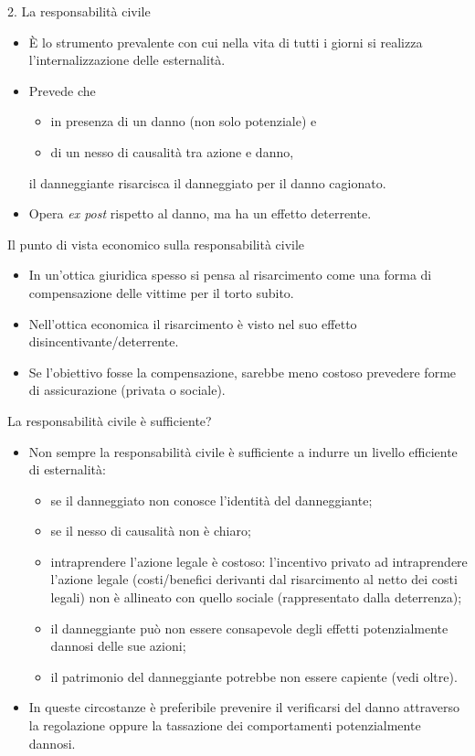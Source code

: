 \documentclass[aspectratio=64,12pt]{beamer}
\begin{document}
\begin{frame}{2. La responsabilità civile}
\begin{itemize}
\item È lo strumento prevalente con cui nella vita di tutti i giorni si realizza
l'internalizzazione delle esternalità.
\item Prevede che
\begin{itemize}
\item in presenza di un danno (non solo potenziale) e
\item di un nesso di causalità tra azione e danno,
\end{itemize}
il danneggiante risarcisca il danneggiato per il danno cagionato.
\item Opera \emph{ex post} rispetto al danno, ma ha un effetto deterrente.
\end{itemize}

\begin{block}{Il punto di vista economico sulla responsabilità civile}
\fontsize{10}{11}\selectfont
\begin{itemize}
\item In un'ottica giuridica spesso si pensa al risarcimento come una forma di
\alert{compensazione delle vittime} per il torto subito.
\item Nell'ottica economica il risarcimento è visto nel suo effetto
disincentivante/deterrente.
\item Se l'obiettivo fosse la compensazione, sarebbe meno costoso prevedere forme
di assicurazione (privata o sociale).
\end{itemize}
\end{block}
\end{frame}

\begin{frame}{La responsabilità civile è sufficiente?}
\begin{itemize}
\item Non sempre la responsabilità civile è sufficiente a indurre un livello
efficiente di esternalità:
\begin{itemize}
\item se il danneggiato non conosce l'identità del danneggiante;
\item se il nesso di causalità non è chiaro;
\item intraprendere l'azione legale è costoso: l'incentivo privato ad
intraprendere l'azione legale (costi/benefici derivanti dal risarcimento al
netto dei costi legali) non è allineato con quello sociale (rappresentato
dalla deterrenza);
\item il danneggiante può non essere consapevole degli effetti potenzialmente
dannosi delle sue azioni;
\item il patrimonio del danneggiante potrebbe non essere capiente (vedi oltre).
\end{itemize}
\item In queste circostanze è preferibile \alert{prevenire} il verificarsi del danno
attraverso la regolazione oppure la tassazione dei comportamenti
potenzialmente dannosi.
\end{itemize}
\end{frame}
\end{document}
